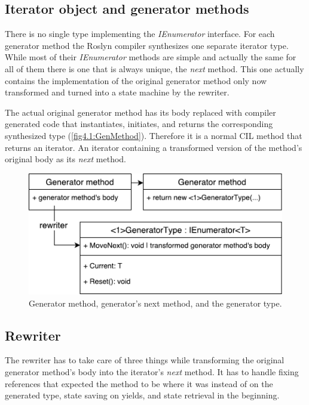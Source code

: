 \subsection{Iterator object and generator methods}

There is no single type implementing the \emph{IEnumerator} interface. For each generator method the Roslyn compiler synthesizes one separate iterator type. While most of their \emph{IEnumerator} methods are simple and actually the same for all of them there is one that is always unique, the \emph{next} method. This one actually contains the implementation of the original generator method only now transformed and turned into a state machine by the rewriter.

The actual original generator method has its body replaced with compiler generated code that instantiates, initiates, and returns the corresponding synthesized type (\autoref{fig4.1:GenMethod}). Therefore it is a normal CIL method that returns an iterator. An iterator containing a transformed version of the method’s original body as its \emph{next} method.

\begin{figure}[h]
	\centering	
	\includegraphics[scale=0.75]{../img/4_1_generatormethods}	
	\caption{Generator method, generator's next method, and the generator type.}
	\label{fig4.1:GenMethod}
\end{figure}

\subsection{Rewriter}

The rewriter has to take care of three things while transforming the original generator method’s body into the iterator’s \emph{next} method. It has to handle fixing references that expected the method to be where it was instead of on the generated type, state saving on yields, and state retrieval in the beginning. 

